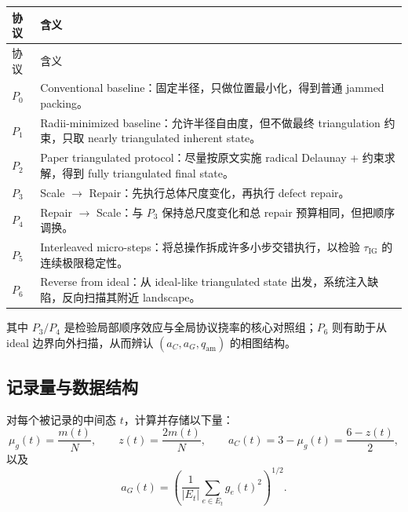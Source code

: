 \documentclass[12pt]{ctexart}
\newcommand{\IG}{\mathrm{IG}}
\begin{document}
\begin{longtable}{>{\raggedright\arraybackslash}p{} >{\raggedright\arraybackslash}p{}}
\toprule
协议 & 含义 \\
\midrule
\endfirsthead
\toprule
协议 & 含义 \\
\midrule
\endhead
\bottomrule
\endfoot
$P_0$ & Conventional baseline：固定半径，只做位置最小化，得到普通 jammed packing。\\
$P_1$ & Radii-minimized baseline：允许半径自由度，但不做最终 triangulation 约束，只取 nearly triangulated inherent state。\\
$P_2$ & Paper triangulated protocol：尽量按原文实施 radical Delaunay + 约束求解，得到 fully triangulated final state。\\
$P_3$ & Scale $\to$ Repair：先执行总体尺度变化，再执行 defect repair。\\
$P_4$ & Repair $\to$ Scale：与 $P_3$ 保持总尺度变化和总 repair 预算相同，但把顺序调换。\\
$P_5$ & Interleaved micro-steps：将总操作拆成许多小步交错执行，以检验 $\tau_{\IG}$ 的连续极限稳定性。\\
$P_6$ & Reverse from ideal：从 ideal-like triangulated state 出发，系统注入缺陷，反向扫描其附近 landscape。\\
\end{longtable}

其中 $P_3/P_4$ 是检验局部顺序效应与全局协议挠率的核心对照组；$P_6$ 则有助于从 ideal 边界向外扫描，从而辨认 $(a_C,a_G,q_{\mathrm{am}})$ 的相图结构。

\subsection{记录量与数据结构}

对每个被记录的中间态 $t$，计算并存储以下量：
\begin{equation}
\mu_g(t)=\frac{m(t)}{N},
\qquad
z(t)=\frac{2m(t)}{N},
\qquad
a_C(t)=3-\mu_g(t)=\frac{6-z(t)}{2},
\end{equation}
以及
\begin{equation}
a_G(t)=\left(\frac{1}{|E_t|}\sum_{e\in E_t} g_e(t)^2\right)^{1/2}.
\end{equation}
\end{document}
